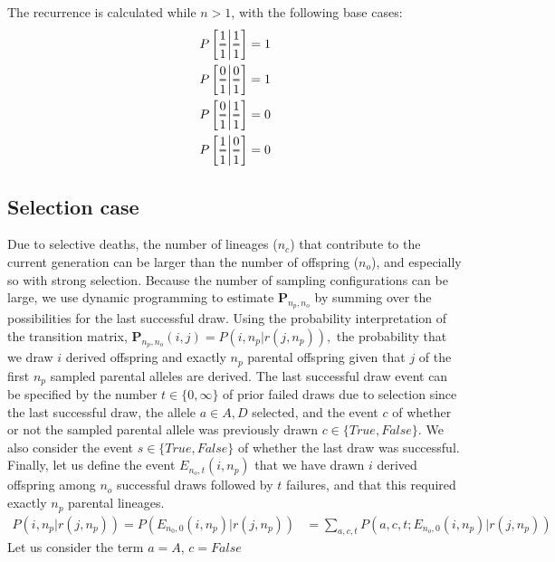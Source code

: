 \documentclass[review]{elsarticle}
\newcommand{\Dfrac}[2]{%
  \ooalign{%
    $\genfrac{}{}{1.2pt}0{#1}{#2}$\cr%
    $\color{white}\genfrac{}{}{.4pt}0{\phantom{#1}}{\phantom{#2}}$}%
}
\newcommand{\cond}{\middle\vert}
\newcommand{\sgcomment}[1]{{\color{red}{SG: #1}}}
\begin{document}
The recurrence is calculated while $n>1$, with the following base cases:
\begin{align*}
  P\left[ \Dfrac{1}{1} \cond \Dfrac{1}{1} \right] &= 1 \\
  P\left[ \Dfrac{0}{1} \cond \Dfrac{0}{1} \right] &= 1 \\
  P\left[ \Dfrac{0}{1} \cond \Dfrac{1}{1} \right] &= 0 \\
  P\left[ \Dfrac{1}{1} \cond \Dfrac{0}{1} \right] &= 0 \\
\end{align*}

\subsection{Selection case}

Due to selective deaths, the number of lineages ($n_c$) that contribute to the current generation
can be larger than the number of offspring ($n_o$), and especially so with strong
selection. Because the number of sampling configurations can be large, we use dynamic programming 
to estimate $\mathbf{P}_{n_p,n_o}$ by summing over the possibilities for the last successful draw. Using the
probability interpretation of the transition matrix, $\mathbf{P}_{n_p,n_o}(i,j) = P(i, n_p | r(j, n_p)),$ the
probability that we draw $i$ derived offspring and exactly $n_p$ parental offspring given that $j$ of the first
$n_p$ sampled parental alleles are derived.  The last successful draw event can be specified by the number $t \in \{0,\infty\}$ 
of prior failed draws due to selection since the last successful draw, the allele $a \in {A, D}$ selected, 
and the event $c$ of whether or not the sampled parental allele was previously drawn $c\in \{True, False\}$. We also consider the event $s \in \{True, False\}$ of whether the last draw was successful. Finally, let us define the event $E_{n_o,t}(i,n_p)$ that we have drawn 
$i$ derived offspring among $n_o$ successful draws followed by $t$ failures, and that this required exactly $n_p$ parental lineages.   
\begin{equation}
\begin{split}
P(i, n_p | r(j, n_p)) = P(E_{n_0,0}(i,n_p)  | r(j, n_p)) &=  \sum_{a, c,t} P(a,c,t; E_{n_o,0}(i,n_p)  | r(j, n_p)) 
 \end{split}
\end{equation}
Let us consider the term $a=A$, $c=False$ \sgcomment{We could use a better notation here, eg using tikz. }
\end{document}
